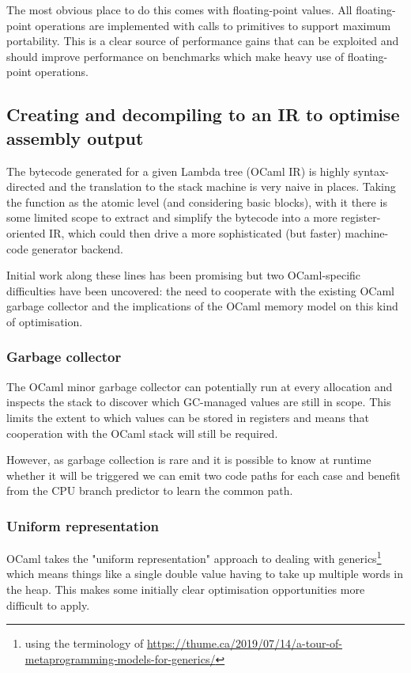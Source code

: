 \documentclass[12pt,a4paper, headings=standardclasses, parskip=on]{scrartcl}
\begin{document}
The most obvious place to do this comes with floating-point values. All
floating-point operations are implemented with calls to primitives to support
maximum portability. This is a clear source of performance gains that can be
exploited and should improve performance on benchmarks which make heavy use
of floating-point operations.

\subsection{Creating and decompiling to an IR to optimise assembly output} \label{ir}

The bytecode generated for a given Lambda tree (OCaml IR) is highly
syntax-directed and the translation to the stack machine is very naive in
places. Taking the function as the atomic level (and considering basic
blocks), with it there is some limited scope to extract and simplify the
bytecode into a more register-oriented IR, which could
then drive a more sophisticated (but faster) machine-code generator backend.

Initial work along these lines has been promising but two OCaml-specific
difficulties have been uncovered: the need to cooperate with the existing
OCaml garbage collector and the implications of the OCaml memory model on
this kind of optimisation.

\subsubsection*{Garbage collector}

The OCaml minor garbage collector can potentially run at every allocation and inspects the stack to discover
which GC-managed values are still in scope. This limits the extent to which values can be stored in registers
and means that cooperation with the OCaml stack will still be required.

However, as garbage collection is rare and it is possible to know at runtime whether it will be triggered
we can emit two code paths for each case and benefit from the CPU branch predictor to learn the common path.

\subsubsection*{Uniform representation}

OCaml takes the "uniform representation" approach to dealing with generics\footnote{using the terminology of \url{https://thume.ca/2019/07/14/a-tour-of-metaprogramming-models-for-generics/}}
which means things like a single double value having to take up multiple
words in the heap. This makes some initially clear optimisation opportunities
more difficult to apply.
\end{document}
